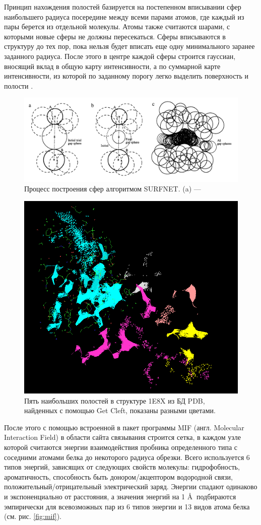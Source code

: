\documentclass[a4paper,14pt]{article}         %
\newcommand{\sic}[1]{\LARGE\color{orange}{#1}\color{black}\Large}
\begin{document}
Принцип нахождения полостей базируется на постепенном вписывании сфер наибольшего радиуса посередине между всеми парами атомов, где каждый из пары берется из отдельной молекулы. Атомы также считаются шарами, с которыми новые сферы не должны пересекаться. Сферы вписываются в структуру до тех пор, пока нельзя будет вписать еще одну минимального заранее заданного радиуса. После этого в центре каждой сферы строится гауссиан, вносящий вклад в общую карту интенсивности, а по суммарной карте интенсивности, из которой по заданному порогу легко выделить поверхность и полости \cite{Laskowski1995}.
\begin{figure} 
	\centering
	\includegraphics[width=1\linewidth]{pictures/surfnet}
	\caption{Процесс построения сфер алгоритмом SURFNET. (a) ---  \sic{Дописать}}
	\label{fig:surfnet}
\end{figure}
\fi
\begin{figure} 
		\centering
		\includegraphics[width=0.6\linewidth]{pictures/clefts}
		\caption{Пять наибольших полостей в структуре 1E8X из БД PDB, найденных с помощью Get Cleft, показаны разными цветами.}
		\label{fig:cleft}
\end{figure}

После этого с помощью встроенной в пакет программы MIF (англ. Molecular Interaction Field) в области сайта связывания строится сетка, в каждом узле которой считаются энергии взаимодействия пробника определенного типа с соседними атомами белка до некоторого радиуса обрезки. Всего используется 6 типов энергий, зависящих от следующих свойств молекулы: гидрофобность, ароматичность, способность быть донором/акцептором водородной связи, положительный/отрицательный электрический заряд. Энергии спадают одинаково и экспоненциально от расстояния, а значения энергий на 1 \AA $\:$ подбираются эмпирически для всевозможных пар из 6 типов энергии и 13 видов атома белка (см. рис. \ref{fig:mif}).
\end{document}
